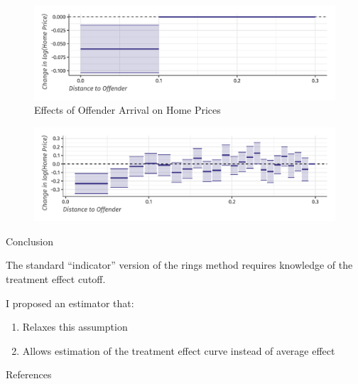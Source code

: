 \documentclass[aspectratio=43]{beamer}
\begin{document}
\begin{frame}
    \begin{figure}
        \caption{Effects of Offender Arrival on Home Prices \citep{Linden_Rockoff_2008}}
        \centering
        \includegraphics[width=\textwidth]{../../figures/linden_rockoff_did.pdf}
    \end{figure}
    \vspace{-5mm}
    \begin{figure}
        \vspace{-5mm}
        \centering
        \includegraphics[width=\textwidth]{../../figures/linden_rockoff.pdf}
    \end{figure}
\end{frame}



\begin{frame}{Conclusion}

The standard ``indicator'' version of the rings method requires knowledge of the treatment effect cutoff.

\vspace{5mm}
I proposed an estimator that:
    \begin{enumerate}
        \item Relaxes this assumption
        \item Allows estimation of the treatment effect curve instead of average effect
    \end{enumerate}

\vspace{5mm}
\begin{center}
\color{alice}{Thank you!}
\end{center}
    
\end{frame}



\begin{frame}[allowframebreaks]{References}
    \printbibliography
\end{frame}
\end{document}
